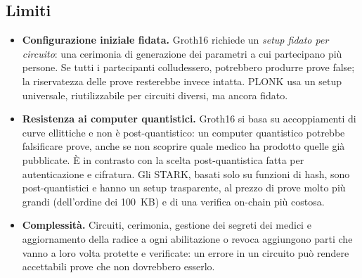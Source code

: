 \subsection{Limiti}
\begin{itemize}
  \item \textbf{Configurazione iniziale fidata.} Groth16 richiede un \emph{setup fidato per circuito}: una cerimonia di generazione dei parametri a cui partecipano più persone. Se tutti i partecipanti colludessero, potrebbero produrre prove false; la riservatezza delle prove resterebbe invece intatta. PLONK usa un setup universale, riutilizzabile per circuiti diversi, ma ancora fidato.
  \item \textbf{Resistenza ai computer quantistici.} Groth16 si basa su accoppiamenti di curve ellittiche e non è post-quantistico: un computer quantistico potrebbe falsificare prove, anche se non scoprire quale medico ha prodotto quelle già pubblicate. È in contrasto con la scelta post-quantistica fatta per autenticazione e cifratura. Gli STARK\cite{stark}, basati solo su funzioni di hash, sono post-quantistici e hanno un setup trasparente, al prezzo di prove molto più grandi (dell'ordine dei 100~KB) e di una verifica on-chain più costosa.
  \item \textbf{Complessità.} Circuiti, cerimonia, gestione dei segreti dei medici e aggiornamento della radice a ogni abilitazione o revoca aggiungono parti che vanno a loro volta protette e verificate: un errore in un circuito può rendere accettabili prove che non dovrebbero esserlo.
\end{itemize}
